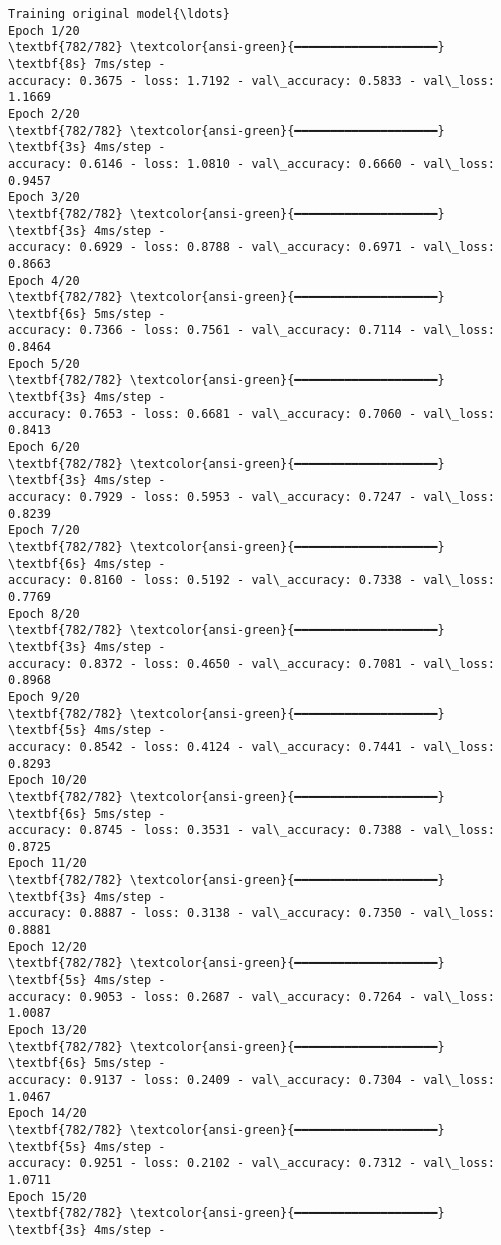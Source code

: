 \documentclass[11pt]{article}
\begin{document}
    \begin{Verbatim}[commandchars=\\\{\}]
Training original model{\ldots}
Epoch 1/20
\textbf{782/782} \textcolor{ansi-green}{━━━━━━━━━━━━━━━━━━━━} \textbf{8s} 7ms/step -
accuracy: 0.3675 - loss: 1.7192 - val\_accuracy: 0.5833 - val\_loss: 1.1669
Epoch 2/20
\textbf{782/782} \textcolor{ansi-green}{━━━━━━━━━━━━━━━━━━━━} \textbf{3s} 4ms/step -
accuracy: 0.6146 - loss: 1.0810 - val\_accuracy: 0.6660 - val\_loss: 0.9457
Epoch 3/20
\textbf{782/782} \textcolor{ansi-green}{━━━━━━━━━━━━━━━━━━━━} \textbf{3s} 4ms/step -
accuracy: 0.6929 - loss: 0.8788 - val\_accuracy: 0.6971 - val\_loss: 0.8663
Epoch 4/20
\textbf{782/782} \textcolor{ansi-green}{━━━━━━━━━━━━━━━━━━━━} \textbf{6s} 5ms/step -
accuracy: 0.7366 - loss: 0.7561 - val\_accuracy: 0.7114 - val\_loss: 0.8464
Epoch 5/20
\textbf{782/782} \textcolor{ansi-green}{━━━━━━━━━━━━━━━━━━━━} \textbf{3s} 4ms/step -
accuracy: 0.7653 - loss: 0.6681 - val\_accuracy: 0.7060 - val\_loss: 0.8413
Epoch 6/20
\textbf{782/782} \textcolor{ansi-green}{━━━━━━━━━━━━━━━━━━━━} \textbf{3s} 4ms/step -
accuracy: 0.7929 - loss: 0.5953 - val\_accuracy: 0.7247 - val\_loss: 0.8239
Epoch 7/20
\textbf{782/782} \textcolor{ansi-green}{━━━━━━━━━━━━━━━━━━━━} \textbf{6s} 4ms/step -
accuracy: 0.8160 - loss: 0.5192 - val\_accuracy: 0.7338 - val\_loss: 0.7769
Epoch 8/20
\textbf{782/782} \textcolor{ansi-green}{━━━━━━━━━━━━━━━━━━━━} \textbf{3s} 4ms/step -
accuracy: 0.8372 - loss: 0.4650 - val\_accuracy: 0.7081 - val\_loss: 0.8968
Epoch 9/20
\textbf{782/782} \textcolor{ansi-green}{━━━━━━━━━━━━━━━━━━━━} \textbf{5s} 4ms/step -
accuracy: 0.8542 - loss: 0.4124 - val\_accuracy: 0.7441 - val\_loss: 0.8293
Epoch 10/20
\textbf{782/782} \textcolor{ansi-green}{━━━━━━━━━━━━━━━━━━━━} \textbf{6s} 5ms/step -
accuracy: 0.8745 - loss: 0.3531 - val\_accuracy: 0.7388 - val\_loss: 0.8725
Epoch 11/20
\textbf{782/782} \textcolor{ansi-green}{━━━━━━━━━━━━━━━━━━━━} \textbf{3s} 4ms/step -
accuracy: 0.8887 - loss: 0.3138 - val\_accuracy: 0.7350 - val\_loss: 0.8881
Epoch 12/20
\textbf{782/782} \textcolor{ansi-green}{━━━━━━━━━━━━━━━━━━━━} \textbf{5s} 4ms/step -
accuracy: 0.9053 - loss: 0.2687 - val\_accuracy: 0.7264 - val\_loss: 1.0087
Epoch 13/20
\textbf{782/782} \textcolor{ansi-green}{━━━━━━━━━━━━━━━━━━━━} \textbf{6s} 5ms/step -
accuracy: 0.9137 - loss: 0.2409 - val\_accuracy: 0.7304 - val\_loss: 1.0467
Epoch 14/20
\textbf{782/782} \textcolor{ansi-green}{━━━━━━━━━━━━━━━━━━━━} \textbf{5s} 4ms/step -
accuracy: 0.9251 - loss: 0.2102 - val\_accuracy: 0.7312 - val\_loss: 1.0711
Epoch 15/20
\textbf{782/782} \textcolor{ansi-green}{━━━━━━━━━━━━━━━━━━━━} \textbf{3s} 4ms/step -

\end{Verbatim}
\end{document}
